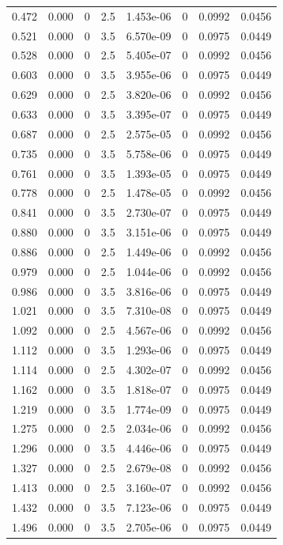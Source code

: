 \documentclass[preview]{standalone}
\begin{document}
{{\begin{tabular}{L{1.2cm}C{1.2cm} C{0.3cm}C{0.5cm} C{1.4cm}C{1.4cm} C{1.4cm}C{1.4cm}}
  0.472  &  0.000  & 0     & 2.5 &  1.453e-06  & 0  & 0.0992 &  0.0456   \\ 
  0.521  &  0.000  & 0     & 3.5 &  6.570e-09  & 0  & 0.0975 &  0.0449   \\ 
  0.528  &  0.000  & 0     & 2.5 &  5.405e-07  & 0  & 0.0992 &  0.0456   \\ 
  0.603  &  0.000  & 0     & 3.5 &  3.955e-06  & 0  & 0.0975 &  0.0449   \\ 
  0.629  &  0.000  & 0     & 2.5 &  3.820e-06  & 0  & 0.0992 &  0.0456   \\ 
  0.633  &  0.000  & 0     & 3.5 &  3.395e-07  & 0  & 0.0975 &  0.0449   \\ 
  0.687  &  0.000  & 0     & 2.5 &  2.575e-05  & 0  & 0.0992 &  0.0456   \\ 
  0.735  &  0.000  & 0     & 3.5 &  5.758e-06  & 0  & 0.0975 &  0.0449   \\ 
  0.761  &  0.000  & 0     & 3.5 &  1.393e-05  & 0  & 0.0975 &  0.0449   \\ 
  0.778  &  0.000  & 0     & 2.5 &  1.478e-05  & 0  & 0.0992 &  0.0456   \\ 
  0.841  &  0.000  & 0     & 3.5 &  2.730e-07  & 0  & 0.0975 &  0.0449   \\ 
  0.880  &  0.000  & 0     & 3.5 &  3.151e-06  & 0  & 0.0975 &  0.0449   \\ 
  0.886  &  0.000  & 0     & 2.5 &  1.449e-06  & 0  & 0.0992 &  0.0456   \\ 
  0.979  &  0.000  & 0     & 2.5 &  1.044e-06  & 0  & 0.0992 &  0.0456   \\ 
  0.986  &  0.000  & 0     & 3.5 &  3.816e-06  & 0  & 0.0975 &  0.0449   \\ 
  1.021  &  0.000  & 0     & 3.5 &  7.310e-08  & 0  & 0.0975 &  0.0449   \\ 
  1.092  &  0.000  & 0     & 2.5 &  4.567e-06  & 0  & 0.0992 &  0.0456   \\ 
  1.112  &  0.000  & 0     & 3.5 &  1.293e-06  & 0  & 0.0975 &  0.0449   \\ 
  1.114  &  0.000  & 0     & 2.5 &  4.302e-07  & 0  & 0.0992 &  0.0456   \\ 
  1.162  &  0.000  & 0     & 3.5 &  1.818e-07  & 0  & 0.0975 &  0.0449   \\ 
  1.219  &  0.000  & 0     & 3.5 &  1.774e-09  & 0  & 0.0975 &  0.0449   \\ 
  1.275  &  0.000  & 0     & 2.5 &  2.034e-06  & 0  & 0.0992 &  0.0456   \\ 
  1.296  &  0.000  & 0     & 3.5 &  4.446e-06  & 0  & 0.0975 &  0.0449   \\ 
  1.327  &  0.000  & 0     & 2.5 &  2.679e-08  & 0  & 0.0992 &  0.0456   \\ 
  1.413  &  0.000  & 0     & 2.5 &  3.160e-07  & 0  & 0.0992 &  0.0456   \\ 
  1.432  &  0.000  & 0     & 3.5 &  7.123e-06  & 0  & 0.0975 &  0.0449   \\ 
  1.496  &  0.000  & 0     & 3.5 &  2.705e-06  & 0  & 0.0975 &  0.0449   \\ 
\hline 
\end{tabular} 

}}
\end{document}
